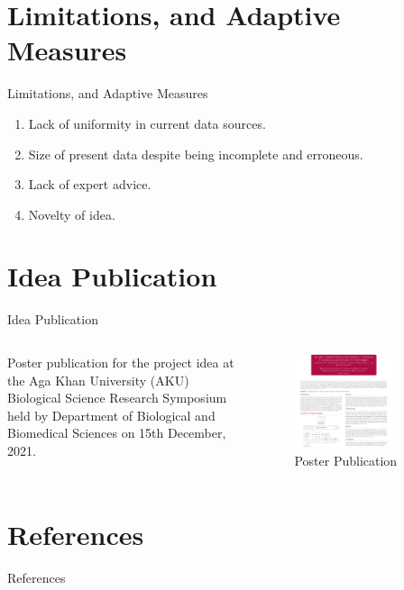 \documentclass[aspectratio=169]{beamer}
\begin{document}
\section{Limitations, and Adaptive Measures}
\begin{frame}{Limitations, and Adaptive Measures}
    \begin{enumerate}
        \item Lack of uniformity in current data sources.
        \item Size of present data despite being incomplete and erroneous.
        \item Lack of expert advice.
        \item Novelty of idea.
    \end{enumerate}
\end{frame}

\section*{Idea Publication}
\begin{frame}{Idea Publication}
    \begin{columns}
        \begin{column}{0.5\textwidth}
                Poster publication for the project idea at the Aga Khan University (AKU) Biological Science Research Symposium held by Department of Biological and Biomedical Sciences on 15th December, 2021.
        \end{column}
        \begin{column}{0.5\textwidth}
            \begin{figure}
            \centering
                \includegraphics[width=0.75\textwidth]{Documentation/Presentation/publication.PNG}
                \caption{Poster Publication}
            \end{figure}
        \end{column}
    \end{columns}
\end{frame}

\section{References}

\begin{frame}[allowframebreaks]{References}
    \nocite{*}
    \printbibliography
\end{frame}
    
\end{document}
